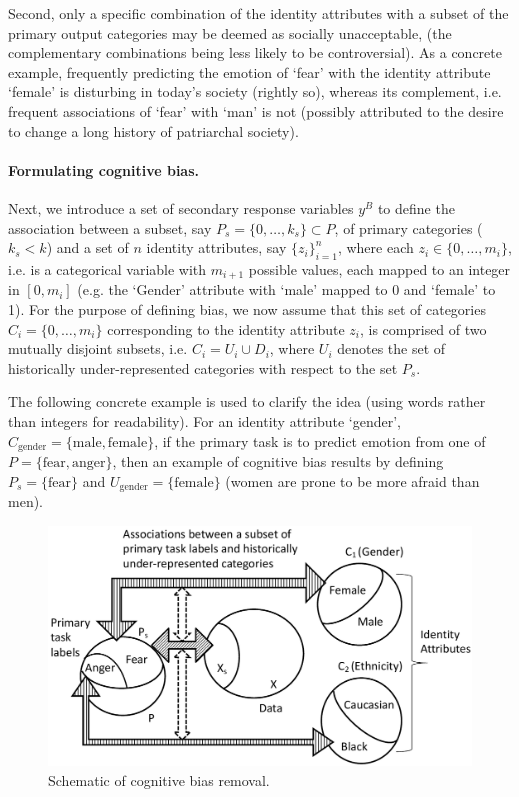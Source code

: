 \documentclass[letterpaper]{article}
\begin{document}
Second, only a specific combination of the identity attributes with a subset of the primary output categories may be deemed as socially unacceptable, (the complementary combinations being less likely to be controversial). As a concrete example, frequently predicting the emotion of `fear' with the identity attribute `female' is disturbing in today's society (rightly so), whereas its complement, i.e. frequent associations of `fear' with `man' is not (possibly attributed to the desire to change a long history of patriarchal society). 

\paragraph{Formulating cognitive bias.}
Next, we introduce a set of secondary response variables $y^B$ to define the association between a subset, say $P_s=\{0,\ldots,k_s\} \subset P$,
of primary categories ($k_s < k$) and a set of $n$ identity attributes, say $\{z_i\}_{i=1}^n$, where each $z_i \in \{0,\ldots,m_i\}$, i.e. is a categorical variable with $m_{i+1}$ possible values, each mapped to an integer in $[0,m_i]$ (e.g. the `Gender' attribute with `male' mapped to 0 and `female' to 1).
For the purpose of defining bias, we now assume that this set of categories $C_i=\{0,\ldots,m_i\}$ corresponding to the identity attribute $z_i$, is comprised of two mutually disjoint subsets, i.e. $C_i=U_i \cup D_i$, where $U_i$ denotes the set of historically under-represented categories with respect to the set $P_s$.

The following concrete example is used to clarify the idea (using words rather than integers for readability). For an identity attribute `gender',
$C_{\mathrm{gender}}=\{\mathrm{male}, \mathrm{female}\}$, if the primary task is to predict emotion from one of $P=\{\mathrm{fear},\mathrm{anger}\}$, then an example of cognitive bias results by defining
$P_s=\{\mathrm{fear}\}$ and $U_{\mathrm{gender}}=\{\mathrm{female}\}$ (women are prone to be more afraid than men).

\begin{figure}[t]
    \centering
    \includegraphics[width=.8\columnwidth]{bias-schematic.pdf}
    \caption{Schematic of cognitive bias removal.}
    \label{fig:schematic-bias}
\end{figure}
\end{document}
